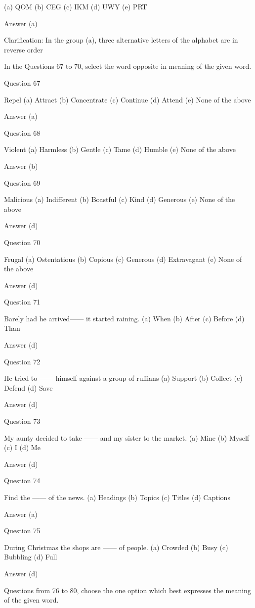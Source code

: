 (a) QOM
(b) CEG
(c) IKM
(d) UWY
(e) PRT

Answer (a)

Clarification: In the group (a), three alternative letters of the alphabet are in reverse order

In the Questions 67 to 70, select the word opposite in meaning of the given word.

Question 67

Repel
(a) Attract
(b) Concentrate
(c) Continue
(d) Attend
(e) None of the above

Answer (a)

Question 68

Violent
(a) Harmless
(b) Gentle
(c) Tame
(d) Humble
(e) None of the above

Answer (b)

Question 69

Malicious
(a) Indifferent
(b) Boastful
(c) Kind
(d) Generous
(e) None of the above

Answer (d)

Question 70

Frugal
(a) Ostentatious
(b) Copious
(c) Generous
(d) Extravagant
(e) None of the above

Answer (d)


Question 71

Barely had he arrived------ it started raining.
(a) When
(b) After
(c) Before
(d) Than

Answer (d)

Question 72

He tried to ------ himself against a group of ruffians
(a) Support
(b) Collect
(c) Defend
(d) Save

Answer (d)

Question 73

My aunty decided to take ------ and my sister to the market.
(a) Mine
(b) Myself
(c) I
(d) Me

Answer (d)

Question 74

Find the ------ of the news.
(a) Headings
(b) Topics
(c) Titles
(d) Captions

Answer (a)

Question 75

During Christmas the shops are ------ of people.
(a) Crowded
(b) Busy
(c) Bubbling
(d) Full

Answer (d)


Questions from 76 to 80, choose the one option which best expresses the meaning of the given word.

